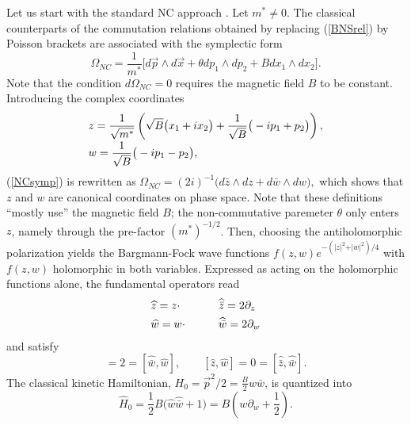 \documentclass[a4paper,11pt]{article}
\newcommand{\half}{{\scriptstyle{\frac{1}{2}}}}
\newcommand{\vx}{{\vec x}}
\def\p{{\partial}}
\def\vp{{\vec p}}
\def\vx{{\vec x}}
\begin{document}
Let us start with the standard NC approach \cite{NaPo, GAMB, BNS}.
Let  $m^*\neq0$.
The classical counterparts
of the commutation relations obtained by
replacing (\ref{BNSrel}) by Poisson brackets
are associated with the symplectic form
\begin{equation}
     \Omega_{NC}=\frac{1}{m^*}\Big[
     d\vp\wedge d\vx+\theta dp_{1}\wedge dp_{2} +
     B dx_{1}\wedge dx_{2}\Big].
     \label{NCsymp}
\end{equation}
Note that the condition $d\Omega_{NC}=0$
requires the magnetic field $B$ to be constant.
Introducing the complex coordinates
\begin{equation}
     \begin{array}{ll}
     z=\displaystyle\frac{1}{\sqrt{m^*}}\left(
     \sqrt{B}\big(x_{1}+ix_{2}\big)
     +
     \frac{1}{\sqrt{B}}\big(-ip_{1}+p_{2}\big)\right),
     \hfill\\[8pt]
     w=\displaystyle\frac{1}{\sqrt{B}}\big(-ip_{1}-p_{2}\big),\hfill\\
     \end{array}
     \label{NCcomplcoord}
\end{equation}
(\ref{NCsymp}) is rewritten as
$
  \Omega_{NC}=(2i)^{-1}\big({d\bar{z}\wedge dz+ d\bar{w}\wedge dw}\big),
$
which shows that $z$ and $w$ are canonical coordinates
on phase space.
Note that these definitions ``mostly use'' the magnetic field
$B$; the non-commutative paremeter $\theta$ only enters $z$, namely
through the  pre-factor $(m^*)^{-1/2}$.
Then, choosing the  antiholomorphic polarization
yields the Bargmann-Fock wave functions
$f(z,w)e^{-(\vert z\vert^2+\vert w\vert^2)/4}$
with $f(z,w)$ holomorphic in both variables.
Expressed as acting on the holomorphic functions alone,
the fundamental operators read
\begin{equation}
    \begin{array}{ll}
    \widehat{z}=z\cdot
    \qquad
    &\widehat{\bar{z}}=2\p_{z}\hfill
    \\[4pt]
    \widehat{w}=w\cdot
    \qquad
    &\widehat{\bar{w}}=2\p_{w}\hfill
    \end{array}
    \label{zwop}
\end{equation}
\noindent
and satisfy
\begin{equation}
	[\widehat{\bar{z}},z]=2=[\widehat{\bar{w}},\widehat{w}],
	\qquad
	[\widehat{z},\widehat{w}]=0=[\widehat{\bar{z}},\widehat{\bar{w}}].
\label{zwcommrel}
\end{equation}
The classical kinetic Hamiltonian,
$H_{0}=\vp^2/2=\frac{B}{2}w\bar{w}$,  is quantized into
\begin{equation}
     \widehat{H}_{0}=\half B\big(\widehat{w}\widehat{\bar{w}}+1\big)
     =B\left(w\p_{w}+\half\right).
     \label{NCkinham}
\end{equation}
\end{document}
